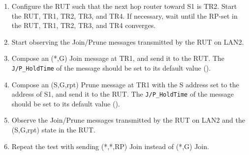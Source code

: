 \documentclass[11pt]{report}
\begin{document}

\begin{enumerate}

  \item Configure the RUT such that the next hop router toward S1 is
  TR2. Start the RUT, TR1, TR2, TR3, and TR4. If necessary, wait until the
  RP-set in the RUT, TR1, TR2, TR3, and TR4 converges.

  \item Start observing the Join/Prune messages transmitted by the RUT on
  LAN2.

  \item Compose an (*,G) Join message at TR1, and send it to the RUT.
  The \verb=J/P_HoldTime= of the message should be set to its default
  value ({\PimsmJPHoldTime}).

  \item Compose an (S,G,rpt) Prune message at TR1 with the S address set to
  the address of S1, and send it to the RUT. The \verb=J/P_HoldTime= of the
  message should be set to its default value ({\PimsmJPHoldTime}).

  \item Observe the Join/Prune messages transmitted by the RUT on LAN2 and the
  (S,G,rpt) state in the RUT.

  \item Repeat the test with sending (*,*,RP) Join instead of (*,G) Join.

\end{enumerate}

\end{document}
